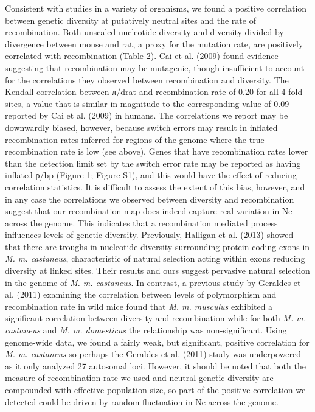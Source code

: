 	Consistent with studies in a variety of organisms, we found a positive correlation between genetic diversity at putatively neutral sites and the rate of recombination. Both unscaled nucleotide diversity and diversity divided by divergence between mouse and rat, a proxy for the mutation rate, are positively correlated with recombination (Table 2). Cai et al. (2009) found evidence suggesting that recombination may be mutagenic, though insufficient to account for the correlations they observed between recombination and diversity. The Kendall correlation between π/drat and recombination rate of 0.20 for all 4-fold sites, a value that is similar in magnitude to the corresponding value of 0.09 reported by Cai et al. (2009) in humans. The correlations we report may be downwardly biased, however, because switch errors may result in inflated recombination rates inferred for regions of the genome where the true recombination rate is low (see above). Genes that have recombination rates lower than the detection limit set by the switch error rate may be reported as having inflated ρ/bp (Figure 1; Figure S1), and this would have the effect of reducing correlation statistics. It is difficult to assess the extent of this bias, however, and in any case the correlations we observed between diversity and recombination suggest that our recombination map does indeed capture real variation in Ne across the genome. This indicates that a recombination mediated process influences levels of genetic diversity. Previously, Halligan et al. (2013) showed that there are troughs in nucleotide diversity surrounding protein coding exons in \emph{M. m. castaneus}, characteristic of natural selection acting within exons reducing diversity at linked sites. Their results and ours suggest pervasive natural selection in the genome of \emph{M. m. castaneus}. In contrast, a previous study by Geraldes et al. (2011) examining the correlation between levels of polymorphism and recombination rate in wild mice found that \emph{M. m. musculus} exhibited a significant correlation between diversity and recombination while for both \emph{M. m. castaneus} and \emph{M. m. domesticus} the relationship was non-significant. Using genome-wide data, we found a fairly weak, but significant, positive correlation for \emph{M. m. castaneus} so perhaps the Geraldes et al. (2011) study was underpowered as it only analyzed 27 autosomal loci. However, it should be noted that both the measure of recombination rate we used and neutral genetic diversity are compounded with effective population size, so part of the positive correlation we detected could be driven by random fluctuation in Ne across the genome.


